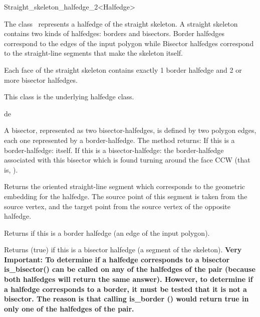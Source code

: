 \begin{ccRefClass} {Straight_skeleton_halfedge_2<Halfedge>}

\ccDefinition

The class \ccClassTemplateName\ represents a halfedge of the straight skeleton.
A straight skeleton contains two kinds of halfedges: borders and bisectors. Border halfedges correspond to the edges of the input polygon while Bisector halfedges correspond to the straight-line segments that make the skeleton itself.

Each face of the straight skeleton contains exactly 1 border halfedge and 2 or more bisector halfedges.
\ccInheritsFrom


This class is the underlying halfedge class.

\ccTypes

\ccThreeToTwo


\ccCreation
{}

{de}




\ccOperations



{A bisector, represented as two bisector-halfedges, is defined by two polygon edges, each one represented by a border-halfedge.
The method returns:
If this is a border-halfedge: itself.
If this is a bisector-halfedge: the border-halfedge associated with this bisector which is found turning around the face CCW (that is, ). }

{Returns the oriented straight-line segment which corresponds to the geometric embedding for the halfedge. The source point of this segment is taken from the source vertex, and the target point from the source vertex of the opposite halfedge.}

{Returns  if this is a border halfedge (an edge of the input polygon).}

{Returns \ccc(true) if this is a bisector halfedge (a segment of the skeleton).
\textbf{Very Important: To determine if a halfedge corresponds to a bisector is\_bisector() can be called on any of the halfedges of the pair (because both halfedges will return the same answer). However, to determine if a halfedge corresponds to a border, it must be tested that it is not a bisector. The reason is that calling is\_border () would return true in only one of the halfedges of the pair.}} 
\end{ccRefClass}

